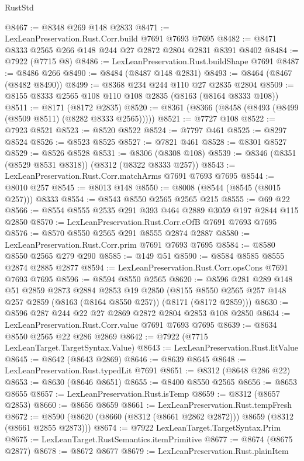 \begin{lexlean}{RustStd}
\begin{coremodule}
@8467 := @8348 @269 @148 @2833
@8471 := LexLeanPreservation.Rust.Corr.build @7691 @7693 @7695
@8482 := @8471 @8333 @2565 @266 @148 @244 @27 @2872 @2804 @2831 @8391 @8402
@8484 := @7922 (@7715 @8)
@8486 := LexLeanPreservation.Rust.buildShape @7691
@8487 := @8486 @266
@8490 := @8484 (@8487 @148 @2831)
@8493 := @8464 (@8467 (@8482 @8490))
@8499 := @8368 @234 @244 @110 @27 @2835 @2804
@8509 := @8155 @8333 @2565 @108 @110 @108 @2835 (@8163 (@8164 @8333 @108))
@8511 := @8171 (@8172 @2835)
@8520 := @8361 (@8366 (@8458 (@8493 (@8499 (@8509 @8511) (@8282 @8333 @2565)))))
@8521 := @7727 @108
@8522 := @7923 @8521
@8523 := @8520 @8522
@8524 := @7797 @461
@8525 := @8297 @8524
@8526 := @8523 @8525
@8527 := @7821 @461
@8528 := @8301 @8527
@8529 := @8526 @8528
@8531 := @8306 (@8308 @108)
@8539 := @8346 (@8351 (@8529 @8531 @8318)) (@8312 (@8322 @8333 @257))
@8543 := LexLeanPreservation.Rust.Corr.matchArms @7691 @7693 @7695
@8544 := @8010 @257
@8545 := @8013 @148
@8550 := @8008 (@8544 (@8545 (@8015 @257))) @8333
@8554 := @8543 @8550 @2565 @2565 @215
@8555 := @69 @22
@8566 := @8554 @8555 @2535 @291 @393 @464 @2889 @3059 @197 @2844 @115 @2850
@8570 := LexLeanPreservation.Rust.Corr.eOfB @7691 @7693 @7695
@8576 := @8570 @8550 @2565 @291 @8555 @2874 @2887
@8580 := LexLeanPreservation.Rust.Corr.prim @7691 @7693 @7695
@8584 := @8580 @8550 @2565 @279 @290
@8585 := @149 @51
@8590 := @8584 @8585 @8555 @2874 @2885 @2877
@8594 := LexLeanPreservation.Rust.Corr.opsCons @7691 @7693 @7695
@8596 := @8594 @8550 @2565
@8620 := @8596
    @281
    @289
    @148
    @51
    @2859
    @2873
    @2884
    @2853
    @19
    @2850
    (@8155 @8550 @2565 @257 @148 @257 @2859 (@8163 (@8164 @8550 @257)) (@8171 (@8172 @2859)))
@8630 := @8596 @287 @244 @22 @27 @2869 @2872 @2804 @2853 @108 @2850
@8634 := LexLeanPreservation.Rust.Corr.value @7691 @7693 @7695
@8639 := @8634 @8550 @2565 @22 @286 @2869
@8642 := @7922 (@7715 LexLeanTarget.TargetSyntax.Value)
@8643 := LexLeanPreservation.Rust.litValue
@8645 := @8642 (@8643 @2869)
@8646 := @8639 @8645
@8648 := LexLeanPreservation.Rust.typedLit @7691
@8651 := @8312 (@8648 @286 @22)
@8653 := @8630 (@8646 @8651)
@8655 := @8400 @8550 @2565
@8656 := @8653 @8655
@8657 := LexLeanPreservation.Rust.isTemp
@8659 := @8312 (@8657 @2853)
@8660 := @8656 @8659
@8661 := LexLeanPreservation.Rust.tempFresh
@8672 := @8590 (@8620 (@8660 (@8312 (@8661 @2862 @2872))) @8659 (@8312 (@8661 @2855 @2873)))
@8674 := @7922 LexLeanTarget.TargetSyntax.Prim
@8675 := LexLeanTarget.RustSemantics.itemPrimitive
@8677 := @8674 (@8675 @2877)
@8678 := @8672 @8677
@8679 := LexLeanPreservation.Rust.plainItem

\end{coremodule}
\end{lexlean}
